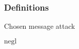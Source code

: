 \begin{frame}
	\frametitle{Definitions}

	\begin{definition}
		Chosen message attack 
    \end{definition}
    
    \begin{definition}
        $\mathrm{negl}$
	\end{definition}
\end{frame}